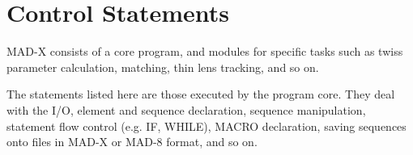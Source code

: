 

%
%
%
%


\chapter{Control Statements} 
MAD-X consists of a core program, and modules for specific tasks such as
twiss parameter calculation, matching, thin lens tracking, and so on.  
 
The statements listed here are those executed by the program core. They
deal with the I/O, element and sequence declaration, sequence
manipulation, statement flow control (e.g. IF, WHILE), MACRO
declaration, saving sequences onto files in MAD-X or MAD-8 format, and
so on.  



